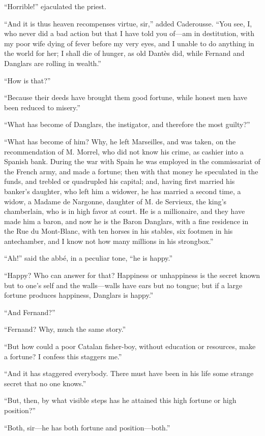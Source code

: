 “Horrible!” ejaculated the priest.

“And it is thus heaven recompenses virtue, sir,” added Caderousse. “You
see, I, who never did a bad action but that I have told you of—am in
destitution, with my poor wife dying of fever before my very eyes, and
I unable to do anything in the world for her; I shall die of hunger, as
old Dantès did, while Fernand and Danglars are rolling in wealth.”

“How is that?”

“Because their deeds have brought them good fortune, while honest men
have been reduced to misery.”

“What has become of Danglars, the instigator, and therefore the most
guilty?”

“What has become of him? Why, he left Marseilles, and was taken, on the
recommendation of M. Morrel, who did not know his crime, as cashier
into a Spanish bank. During the war with Spain he was employed in the
commissariat of the French army, and made a fortune; then with that
money he speculated in the funds, and trebled or quadrupled his
capital; and, having first married his banker’s daughter, who left him
a widower, he has married a second time, a widow, a Madame de Nargonne,
daughter of M. de Servieux, the king’s chamberlain, who is in high
favor at court. He is a millionaire, and they have made him a baron,
and now he is the Baron Danglars, with a fine residence in the Rue du
Mont-Blanc, with ten horses in his stables, six footmen in his
antechamber, and I know not how many millions in his strongbox.”

“Ah!” said the abbé, in a peculiar tone, “he is happy.”

“Happy? Who can answer for that? Happiness or unhappiness is the secret
known but to one’s self and the walls—walls have ears but no tongue;
but if a large fortune produces happiness, Danglars is happy.”

“And Fernand?”

“Fernand? Why, much the same story.”

“But how could a poor Catalan fisher-boy, without education or
resources, make a fortune? I confess this staggers me.”

“And it has staggered everybody. There must have been in his life some
strange secret that no one knows.”

“But, then, by what visible steps has he attained this high fortune or
high position?”

“Both, sir—he has both fortune and position—both.”

